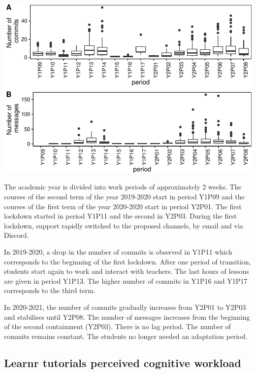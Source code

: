 \documentclass[
]{article}
\begin{document}
\includegraphics{teaching_data_science_files/figure-latex/unnamed-chunk-4-1.pdf}

The academic year is divided into work periods of approximately 2 weeks.
The courses of the second term of the year 2019-2020 start in period
Y1P09 and the courses of the first term of the year 2020-2020 start in
period Y2P01. The first lockdown started in period Y1P11 and the second
in Y2P03. During the first lockdown, support rapidly switched to the
proposed channels, by email and via Discord.

In 2019-2020, a drop in the number of commits is observed in Y1P11 which
corresponds to the beginning of the first lockdown. After one period of
transition, students start again to work and interact with teachers. The
last hours of lessons are given in period Y1P13. The higher number of
commits in Y1P16 and Y1P17 corresponds to the third term.

In 2020-2021, the number of commits gradually increases from Y2P01 to
Y2P03 and stabilises until Y2P08. The number of messages increases from
the beginning of the second containment (Y2P03). There is no lag period.
The number of commits remains constant. The students no longer needed an
adaptation period.

\hypertarget{learnr-tutorials-perceived-cognitive-workload}{%
\subsection{Learnr tutorials perceived cognitive
workload}\label{learnr-tutorials-perceived-cognitive-workload}}
\end{document}

